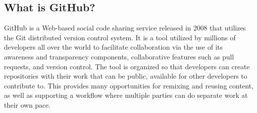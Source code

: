 


\subsection{What is GitHub?}
GitHub is a Web-based social code sharing service released in 2008 that utilizes the Git distributed version control system. It is a tool utilized by millions of developers all over the world to facilitate collaboration via the use of its awareness and transparency components, collaborative features such as pull requests, and version control. The tool is organized so that developers can create repositories with their work that can be public, available for other developers to contribute to. This provides many opportunities for remixing and reusing content, as well as supporting a workflow where multiple parties can do separate work at their own pace.

